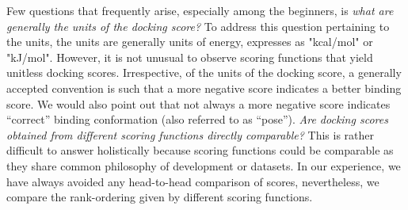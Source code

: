 Few questions that frequently arise, especially among the beginners, is \textit{what are generally the units of the docking score?} To address this question pertaining to the units, the units are generally units of energy, expresses as "kcal/mol" or "kJ/mol". However, it is not unusual to observe scoring functions that yield unitless docking scores. Irrespective, of the units of the docking score, a generally accepted convention is such that a more negative score indicates a better binding score. We would also point out that not always a more negative score indicates “correct” binding conformation (also referred to as “pose”).  
\textit{Are docking scores obtained from different scoring functions directly comparable?} This is rather difficult to answer holistically because scoring functions could be comparable as they share common philosophy of development or datasets. In our experience, we have always avoided any head-to-head comparison of scores, nevertheless, we compare the rank-ordering given by different scoring functions\cite{bib27}.  


